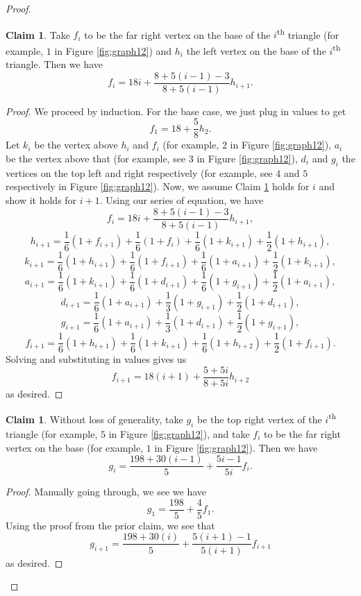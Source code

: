 \documentclass[10pt,a4paper]{amsart}
\theoremstyle{definition}
\numberwithin{definition}{section}
\newtheorem{claim}[definition]{Claim}
\begin{document}
\begin{proof}
\begin{claim}\label{claim:twen}
Take $f_i$ to be the far right vertex on the base of the $i$\textsuperscript{th} triangle (for example, $1$ in Figure \ref{fig:graph12}) and $h_{i}$ the left vertex on the base of the $i$\textsuperscript{th} triangle. Then we have
\[f_i = 18i + \frac{8+5(i-1)-3}{8+5(i-1)}h_{i+1}. \]
\end{claim}

\begin{proof}
We proceed by induction. For the base case, we just plug in values to get 
\[f_1 = 18 + \frac{5}{8}h_2. \]
Let $k_i$ be the vertex above $h_i$ and $f_i$ (for example, $2$ in Figure \ref{fig:graph12}), $a_i$ be the vertex above that (for example, see $3$ in Figure \ref{fig:graph12}), $d_i$ and $g_i$ the vertices on the top left and right respectively (for example, see $4$ and $5$ respectively in Figure \ref{fig:graph12}). Now, we assume Claim \ref{claim:twen} holds for $i$ and show it holds for $i+1$. Using our series of equation, we have 
\[f_i = 18i + \frac{8+5(i-1)-3}{8+5(i-1)}h_{i+1}, \]
\[h_{i+1} = \frac{1}{6}(1+f_{i+1}) + \frac{1}{6}(1+f_i) + \frac{1}{6}(1+k_{i+1}) + \frac{1}{2}(1+h_{i+1}), \]
\[k_{i+1} = \frac{1}{6}(1 + h_{i+1}) + \frac{1}{6}(1+f_{i+1}) + \frac{1}{6}(1+a_{i+1}) + \frac{1}{2}(1+k_{i+1}), \]
\[a_{i+1} = \frac{1}{6}(1+k_{i+1}) + \frac{1}{6}(1+d_{i+1}) + \frac{1}{6}(1+g_{i+1}) + \frac{1}{2}(1+a_{i+1}), \]
\[d_{i+1} = \frac{1}{6}(1+a_{i+1}) + \frac{1}{3}(1+g_{i+1}) + \frac{1}{2}(1+d_{i+1}), \]
\[g_{i+1} = \frac{1}{6}(1+a_{i+1}) + \frac{1}{3}(1+d_{i+1}) + \frac{1}{2}(1+g_{i+1}), \]
\[f_{i+1} = \frac{1}{6}(1+h_{i+1}) + \frac{1}{6}(1+k_{i+1}) + \frac{1}{6}(1+h_{i+2}) + \frac{1}{2}(1+f_{i+1}). \]
Solving and substituting in values gives us 
\[f_{i+1} = 18(i+1) + \frac{5+5i}{8+5i} h_{i+2} \]
as desired.
\end{proof}

\begin{claim}\label{claim:ninet}
Without loss of generality, take $g_i$ be the top right vertex of the $i$\textsuperscript{th} triangle (for example, $5$ in Figure \ref{fig:graph12}), and take $f_i$ to be the far right vertex on the base (for example, $1$ in Figure \ref{fig:graph12}). Then we have
\[g_i = \frac{198 + 30(i-1)}{5} + \frac{5i-1}{5i}f_{i}. \]
\end{claim}

\begin{proof}
Manually going through, we see we have
\[g_1 = \frac{198}{5} + \frac{4}{5}f_1. \]
Using the proof from the prior claim, we see that 
\[g_{i+1} = \frac{198+30(i)}{5} + \frac{5(i+1)-1}{5(i+1)}f_{i+1} \]
as desired. 
\end{proof}


\end{proof}
\end{document}
